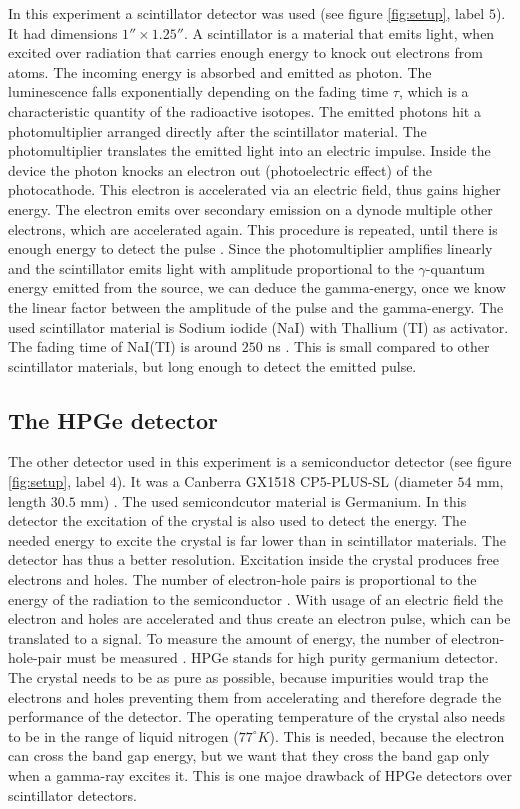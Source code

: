 \documentclass[a4paper]{article}
\begin{document}
In this experiment a scintillator detector was used (see figure \ref{fig:setup}, label $5$). It had dimensions $1 '' \times 1.25 ''$. A scintillator is a material that emits light, when excited over radiation that carries enough energy to knock out electrons from atoms. The incoming energy is absorbed and emitted as photon. The luminescence falls exponentially depending on the fading time $\tau$, which is a characteristic quantity of the radioactive isotopes. The emitted photons hit a photomultiplier arranged directly after the scintillator material. The photomultiplier translates the emitted light into an electric impulse. Inside the device the photon knocks an electron out (photoelectric effect) of the photocathode. This electron is accelerated via an electric field, thus gains higher energy. The electron emits over secondary emission on a dynode multiple other electrons, which are accelerated again. This procedure is repeated, until there is enough energy to detect the pulse \cite{flyckt2002}. Since the photomultiplier amplifies linearly \cite{lush1965} and the scintillator emits light with amplitude proportional to the $\gamma$-quantum energy emitted from the source, we can deduce the gamma-energy, once we know the linear factor between the amplitude of the pulse and the gamma-energy.
\newline
The used scintillator material is Sodium iodide (NaI) with Thallium (TI) as activator. The fading time of NaI(TI) is around $250$ ns \cite{instruction_sheet}. This is small compared to other scintillator materials, but long enough to detect the emitted pulse.

\subsection{The HPGe detector}

The other detector used in this experiment is a semiconductor detector (see figure \ref{fig:setup}, label $4$). It was a Canberra GX1518 CP5-PLUS-SL (diameter $54$ mm, length $30.5$ mm) \cite{datasheet}. The used semicondcutor material is Germanium. In this detector the excitation of the crystal is also used to detect the energy. The needed energy to excite the crystal is far lower than in scintillator materials. The detector has thus a better resolution. Excitation inside the crystal produces free electrons and holes. The number of electron-hole pairs is proportional to the energy of the radiation to the semiconductor \cite{wiki:semi:2018}. With usage of an electric field the electron and holes are accelerated and thus create an electron pulse, which can be translated to a signal. To measure the amount of energy, the number of electron-hole-pair must be measured \cite{knoll1999}. HPGe stands for high purity germanium detector. The crystal needs to be as pure as possible, because impurities would trap the electrons and holes preventing them from accelerating and therefore degrade the performance of the detector. The operating temperature of the crystal also needs to be in the range of liquid nitrogen ($77^{\circ}K$). This is needed, because the electron can cross the band gap energy, but we want that they cross the band gap only when a gamma-ray excites it. This is one majoe drawback of HPGe detectors over scintillator detectors.
\end{document}
